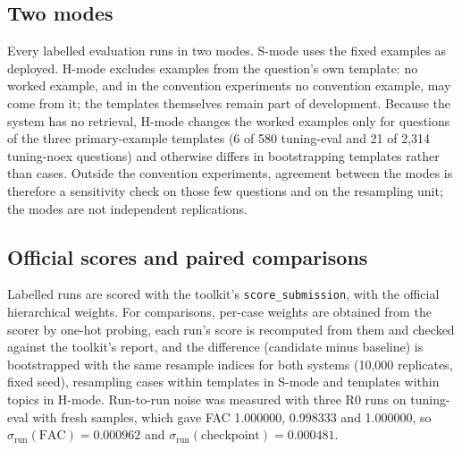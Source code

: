 \documentclass[conference]{IEEEtran}
\newcommand{\id}[1]{\texttt{#1}}
\begin{document}
\subsection{Two modes}
Every labelled evaluation runs in two modes. S-mode uses the fixed examples as deployed. H-mode excludes examples from the question's own template: no worked example, and in the convention experiments no convention example, may come from it; the templates themselves remain part of development. Because the system has no retrieval, H-mode changes the worked examples only for questions of the three primary-example templates (6 of 580 tuning-eval and 21 of 2,314 tuning-noex questions) and otherwise differs in bootstrapping templates rather than cases. Outside the convention experiments, agreement between the modes is therefore a sensitivity check on those few questions and on the resampling unit; the modes are not independent replications.

\subsection{Official scores and paired comparisons}
Labelled runs are scored with the toolkit's \id{score\_submission}, with the official hierarchical weights. For comparisons, per-case weights are obtained from the scorer by one-hot probing, each run's score is recomputed from them and checked against the toolkit's report, and the difference (candidate minus baseline) is bootstrapped with the same resample indices for both systems (10,000 replicates, fixed seed), resampling cases within templates in S-mode and templates within topics in H-mode. Run-to-run noise was measured with three R0 runs on tuning-eval with fresh samples, which gave FAC 1.000000, 0.998333 and 1.000000, so $\sigma_{\mathrm{run}}(\mathrm{FAC})=0.000962$ and $\sigma_{\mathrm{run}}(\mathrm{checkpoint})=0.000481$.
\end{document}
